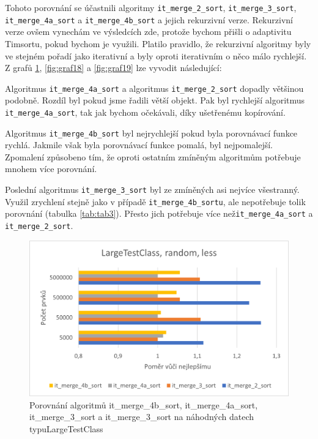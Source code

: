 \documentclass[thesis=B,czech]{FITthesis}[2019/12/23]
\begin{document}
Tohoto porovnání se účastnili algoritmy \texttt{it\_merge\_2\_sort}, \texttt{it\_merge\_3\_sort}, \texttt{it\_merge\_4a\_sort} a \texttt{it\_merge\_4b\_sort} a jejich rekurzivní verze. Rekurzivní verze ovšem vynechám ve výsledcích zde, protože bychom přišli o adaptivitu Timsortu, pokud bychom je využili. Platilo pravidlo, že rekurzivní algoritmy byly ve stejném pořadí jako iterativní a byly oproti iterativním o něco málo rychlejší. Z grafů \ref{fig:graf17}, \ref{fig:graf18} a \ref{fig:graf19} lze vyvodit následující:

Algoritmus \texttt{it\_merge\_4a\_sort} a algoritmus \texttt{it\_merge\_2\_sort} dopadly většinou podobně. Rozdíl byl pokud jsme řadili větší objekt. Pak byl rychlejší algoritmus \texttt{it\_merge\_4a\_sort}, tak jak bychom očekávali, díky ušetřenému kopírování.

Algoritmus \texttt{it\_merge\_4b\_sort} byl nejrychlejší pokud byla porovnávací funkce rychlá. Jakmile však byla porovnávací funkce pomalá, byl nejpomalejší. Zpomalení způsobeno tím, že oproti ostatním zmíněným algoritmům potřebuje mnohem více porovnání.

Poslední algoritmus \texttt{it\_merge\_3\_sort} byl ze zmíněných asi nejvíce všestranný. Využil zrychlení stejně jako v případě \texttt{it\_merge\_4b\_sortu}, ale nepotřebuje tolik porovnání (tabulka \ref{tab:tab3}). Přesto jich potřebuje více než\linebreak \texttt{it\_merge\_4a\_sort} a \texttt{it\_merge\_2\_sort}. 


\begin{figure}[htbp]\centering
	\includegraphics{obrazky/graf17.png}
	\caption[Porovnání algoritmů it\_merge\_4b\_sort, it\_merge\_4a\_sort,\linebreak it\_merge\_3\_sort a it\_merge\_3\_sort na náhodných datech typu LargeTestClass]{Porovnání algoritmů it\_merge\_4b\_sort, it\_merge\_4a\_sort, it\_merge\_3\_sort a it\_merge\_3\_sort na náhodných datech typu\linebreak LargeTestClass}\label{fig:graf17}
\end{figure}
\end{document}
